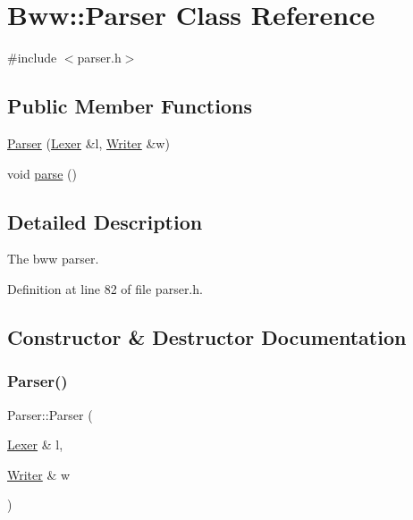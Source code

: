 \hypertarget{class_bww_1_1_parser}{}\section{Bww\+:\+:Parser Class Reference}
\label{class_bww_1_1_parser}


{\ttfamily \#include $<$parser.\+h$>$}

\subsection*{Public Member Functions}
\begin{DoxyCompactItemize}
\item 
\hyperlink{class_bww_1_1_parser_a9b044b379dcc252152ce5837628b1afd}{Parser} (\hyperlink{class_bww_1_1_lexer}{Lexer} \&l, \hyperlink{class_bww_1_1_writer}{Writer} \&w)
\item 
void \hyperlink{class_bww_1_1_parser_ad941a297e9f6abb39271090806a6be33}{parse} ()
\end{DoxyCompactItemize}


\subsection{Detailed Description}
The bww parser. 

Definition at line 82 of file parser.\+h.



\subsection{Constructor \& Destructor Documentation}
\mbox{\label{class_bww_1_1_parser_a9b044b379dcc252152ce5837628b1afd}} 
\subsubsection{\texorpdfstring{Parser()}{Parser()}}
{\footnotesize\ttfamily Parser\+::\+Parser (\begin{DoxyParamCaption}\item[{\hyperlink{class_bww_1_1_lexer}{Lexer} \&}]{l,  }\item[{\hyperlink{class_bww_1_1_writer}{Writer} \&}]{w }\end{DoxyParamCaption})}

